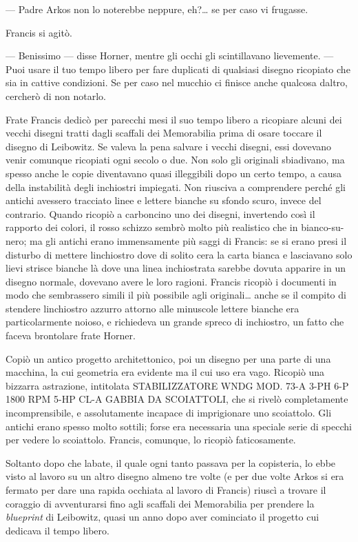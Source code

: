 --- Padre Arkos non lo noterebbe neppure, eh?\ldots{} se per caso vi
frugasse.

Francis si agitò.

--- Benissimo --- disse Horner, mentre gli occhi gli scintillavano
lievemente. --- Puoi usare il tuo tempo libero per fare duplicati di
qualsiasi disegno ricopiato che sia in cattive condizioni. Se per caso
nel mucchio ci finisce anche qualcosa d\textquotesingle altro, cercherò
di non notarlo.

Frate Francis dedicò per parecchi mesi il suo tempo libero a ricopiare
alcuni dei vecchi disegni tratti dagli scaffali dei Memorabilia prima di
osare toccare il disegno di Leibowitz. Se valeva la pena salvare i
vecchi disegni, essi dovevano venir comunque ricopiati ogni secolo o
due. Non solo gli originali sbiadivano, ma spesso anche le copie
diventavano quasi illeggibili dopo un certo tempo, a causa della
instabilità degli inchiostri impiegati. Non riusciva a comprendere
perché gli antichi avessero tracciato linee e lettere bianche su sfondo
scuro, invece del contrario. Quando ricopiò a carboncino uno dei
disegni, invertendo così il rapporto dei colori, il rosso schizzo sembrò
molto più realistico che in bianco-su-nero; ma gli antichi erano
immensamente più saggi di Francis: se si erano presi il disturbo di
mettere l\textquotesingle inchiostro dove di solito
c\textquotesingle era la carta bianca e lasciavano solo lievi strisce
bianche là dove una linea inchiostrata sarebbe dovuta apparire in un
disegno normale, dovevano avere le loro ragioni. Francis ricopiò i
documenti in modo che sembrassero simili il più possibile agli
originali\ldots{} anche se il compito di stendere
l\textquotesingle inchiostro azzurro attorno alle minuscole lettere
bianche era particolarmente noioso, e richiedeva un grande spreco di
inchiostro, un fatto che faceva brontolare frate Horner.

Copiò un antico progetto architettonico, poi un disegno per una parte di
una macchina, la cui geometria era evidente ma il cui uso era vago.
Ricopiò una bizzarra astrazione, intitolata STABILIZZATORE WNDG MOD.
73-A 3-PH 6-P 1800 RPM 5-HP CL-A GABBIA DA SCOIATTOLI, che si rivelò
completamente incomprensibile, e assolutamente incapace di imprigionare
uno scoiattolo. Gli antichi erano spesso molto sottili; forse era
necessaria una speciale serie di specchi per vedere lo scoiattolo.
Francis, comunque, lo ricopiò faticosamente.

Soltanto dopo che l\textquotesingle abate, il quale ogni tanto passava
per la copisteria, lo ebbe visto al lavoro su un altro disegno almeno
tre volte (e per due volte Arkos si era fermato per dare una rapida
occhiata al lavoro di Francis) riuscì a trovare il coraggio di
avventurarsi fino agli scaffali dei Memorabilia per prendere la
\emph{blueprint} di Leibowitz, quasi un anno dopo aver cominciato il
progetto cui dedicava il tempo libero.

